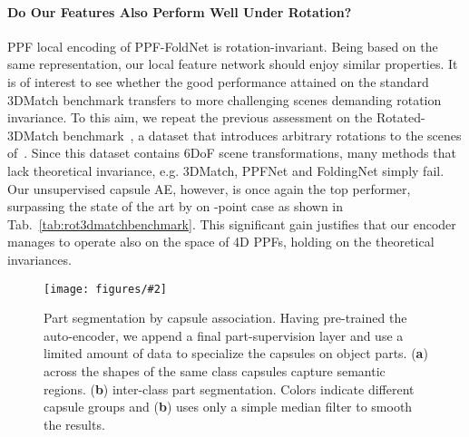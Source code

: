 \documentclass[10pt,twocolumn,letterpaper]{article}
\theoremstyle{break}
\newcommand{\insertimageStar}[5]{ \begin{figure*}[#5]
\centering
\texttt{[image: figures/\#2]}
\caption{#3}
\label{#4}
\end{figure*}
}
\begin{document}
\paragraph{Do Our Features Also Perform Well Under Rotation?} 
PPF local encoding of PPF-FoldNet is rotation-invariant. Being based on the same representation, our local feature network should enjoy similar properties. It is of interest to see whether the good performance attained on the standard 3DMatch benchmark transfers to more challenging scenes demanding rotation invariance. To this aim, we repeat the previous assessment on the Rotated-3DMatch benchmark~\cite{Deng_2018_ECCV}, a dataset that introduces arbitrary rotations to the scenes of~\cite{zeng20163dmatch}. Since this dataset contains 6DoF scene transformations, many methods that lack theoretical invariance, e.g. 3DMatch, PPFNet and FoldingNet simply fail. Our unsupervised capsule AE, however, is once again the top performer, surpassing the state of the art by  on -point case as shown in Tab.~\ref{tab:rot3dmatchbenchmark}. This significant gain justifies that our encoder manages to operate also on the space of 4D PPFs, holding on the theoretical invariances.\vspace{-2mm}
\insertimageStar{.95}{part-seg_cropped.pdf}{Part segmentation by capsule association. Having pre-trained the auto-encoder, we append a final part-supervision layer and use a limited amount of data to specialize the capsules on object parts. (\textbf{a}) across the shapes of the same class capsules capture semantic regions. (\textbf{b}) inter-class part segmentation. Colors indicate different capsule groups and (\textbf{b}) uses only a simple median filter to smooth the results.\vspace{-2mm}}{fig:finetuning}{t!}
\end{document}
